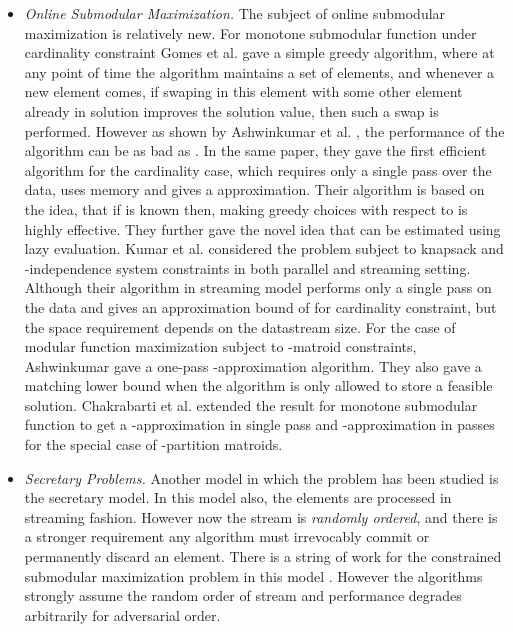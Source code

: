 \documentclass[oneside,letterpaper]{scrartcl} \usepackage{macros}
\begin{document}
\begin{itemize}
\item \textit{Online Submodular Maximization.} The subject of online
  submodular maximization is relatively new. For monotone submodular
  function under cardinality constraint Gomes et al. \cite{gk-10} gave
  a simple greedy algorithm, where at any point of time the algorithm
  maintains a set of  elements, and whenever a new element comes,
  if swaping in this element with some other element already in
  solution improves the solution value, then such a swap is
  performed. However as shown by Ashwinkumar et
  al. \cite{bmkk-sso-14}, the performance of the algorithm can be as
  bad as . In the same paper, they gave the first efficient
  algorithm for the cardinality case, which requires only a single
  pass over the data, uses  memory and
  gives a  approximation.  Their algorithm is based on
  the idea, that if  is known then, making greedy choices with
  respect to  is highly effective. They further gave the novel
  idea that  can be estimated using lazy evaluation. Kumar et
  al. \cite{kmvv-13} considered the problem subject to knapsack and
  -independence system constraints in both parallel and streaming
  setting. Although their algorithm in streaming model performs only a
  single pass on the data and gives an approximation bound of  for cardinality constraint, but the space requirement
  depends on the datastream size. For the case of modular function
  maximization subject to -matroid constraints, Ashwinkumar
  \cite{abv-11} gave a one-pass -approximation algorithm. They also gave a matching lower bound
  when the algorithm is only allowed to store a feasible
  solution. Chakrabarti et al. extended the result for monotone
  submodular function to get a -approximation in single pass and
  -approximation in  passes
  for the special case of -partition matroids.

\item \textit{Secretary Problems.} Another model in which the problem
  has been studied is the secretary model. In this model also, the
  elements are processed in streaming fashion. However now the stream
  is \textit{randomly ordered}, and there is a stronger requirement
  any algorithm must irrevocably commit or permanently discard an
  element. There is a string of work for the constrained submodular
  maximization problem in this model
  \cite{bik-07,bdgit-09,kp-09,grst-10}. However the algorithms
  strongly assume the random order of stream and performance degrades
  arbitrarily for adversarial order.
\end{itemize}
\fi
\end{document}
